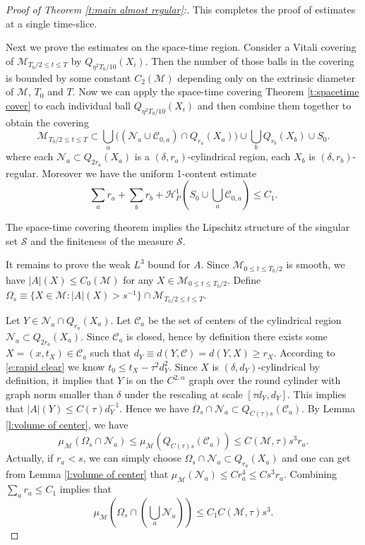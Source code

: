 \documentclass[11pt,reqno]{amsart}
\numberwithin{equation}{section}
\newcommand{\cC}{\mathcal{C}}
\newcommand{\cH}{\mathcal{H}}
\newcommand{\cM}{\mathcal{M}}
\newcommand{\cN}{\mathcal{N}}
\newcommand{\cS}{\mathcal{S}}
\theoremstyle{definition}
\theoremstyle{remark}
\theoremstyle{remark}
\theoremstyle{remark}
\theoremstyle{remark}\newtheorem{conjecture}[equation]{Conjecture}
\theoremstyle{remark}\newtheorem{question}[equation]{Question}
\begin{document}
\begin{proof}[Proof of Theorem \ref{t:main almost regular}:]
This completes the proof of estimates at a single time-slice. 

Next we prove the estimates on the space-time region. Consider a Vitali covering of $\cM_{T_0/2 \le t \le T}$ by $Q_{\eta^2T_0/10}(X_i)$. Then the number of those balls in the covering is bounded by some constant $C_2(\cM)$ depending only on the extrinsic diameter of $\cM$, $T_0$ and $T$. Now we can apply the space-time covering Theorem \ref{t:spacetime cover} to each individual ball $Q_{\eta^2T_0/10}(X_i)$ and then combine them together to obtain the covering
\begin{equation*}
    \cM_{T_0/2 \le t \le T} \subset \bigcup_a \big((\cN_a \cup \cC_{0,a})\cap Q_{r_a}(X_a) \big) \cup \bigcup_b Q_{r_b}(X_b) \cup S_0.
\end{equation*}
where each $\cN_a \subset Q_{2r_a}(X_a)$ is a $(\delta,r_a)$-cylindrical region, each $X_b$ is $(\delta,r_b)$-regular. Moreover we have the uniform 1-content estimate
\begin{equation}
    \sum_a r_a + \sum_b r_b + \cH_P^1(S_0 \cup \bigcup_a\cC_{0,a}) \le C_1.
\end{equation}

The space-time covering theorem implies the Lipschitz structure of the singular set $\cS$ and the finiteness of the measure $\cS$.

It remains to prove the weak $L^3$ bound for $A$. Since $\cM_{0\le t\le T_0/2}$ is smooth, we have $|A|(X) \le C_0(\cM)$ for any $X\in \cM_{0\le t\le T_0/2}$. Define $\Omega_s \equiv \{X \in \cM: |A|(X) > s^{-1}\} \cap \cM_{T_0/2\le t  \le T}$. 

Let $Y \in \cN_a\cap Q_{r_a}(X_a)$. Let $\cC_a$ be the set of centers of the cylindrical region $\cN_a\subset Q_{2r_a}(X_a)$. Since $\cC_a$ is closed, hence by definition there exists some $X=(x,t_X) \in \cC_a$ such that $d_Y \equiv d(Y,\cC) = d(Y,X) \ge r_X$. According to \eqref{e:rapid clear} we know $t_0 \le t_X - \tau^2 d_Y^2$. Since $X$ is $(\delta,d_Y)$-cylindrical by definition, it implies that $Y$ is on the $C^{2,\alpha}$ graph over the round cylinder with graph norm smaller than $\delta$ under the rescaling at scale $[\tau d_Y, d_Y]$. This implies that $|A|(Y) \le C(\tau)d_Y^{-1}$. Hence we have $\Omega_s \cap \cN_a \subset Q_{C(\tau)s}(\cC_a)$. By Lemma \ref{l:volume of center}, we have 
\begin{equation*}
    \mu_{\cM}(\Omega_s \cap \cN_a) \le \mu_{\cM}(Q_{C(\tau) s}(\cC_a)) \le C(\cM,\tau) s^3 r_a. 
\end{equation*}
Actually, if $ r_a<s$, we can simply choose $\Omega_s\cap \cN_a\subset Q_{r_a}(X_a)$ and one can get from Lemma \ref{l:volume of center} that $\mu_{\cM}(\cN_a)\le Cr_a^4\le Cs^3r_a$.  Combining $\sum_a r_a \le C_1$ implies that 
\begin{equation*}
    \mu_{\cM}(\Omega_s \cap (\bigcup_a \cN_a)) \le C_1 C(\cM,\tau) s^3.
\end{equation*}


\end{proof}
\end{document}
